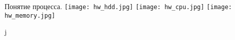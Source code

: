 \begin{frame}{Понятие процесса.}
\texttt{[image: hw\_hdd.jpg]} 
\texttt{[image: hw\_cpu.jpg]}
\texttt{[image: hw\_memory.jpg]}
\end{frame}j
